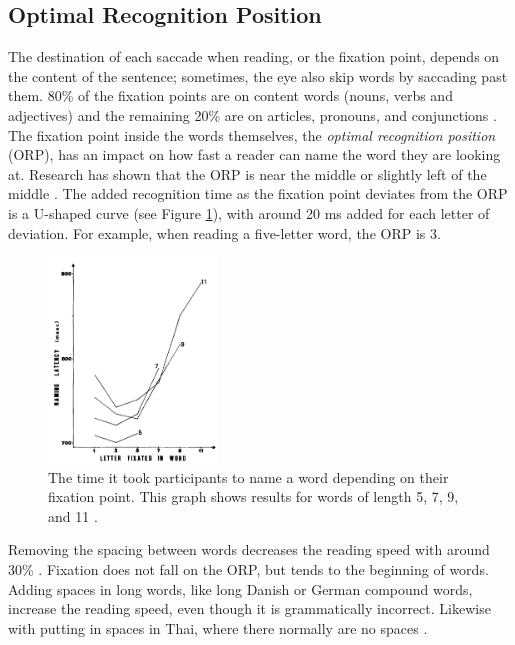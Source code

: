 \subsection{Optimal Recognition Position} \label{ORP}
The destination of each saccade when reading, or the fixation point, depends on the content of the sentence; sometimes, the eye also skip words by saccading past them. 80\% of the fixation points are on content words (nouns, verbs and adjectives) and the remaining 20\% are on articles, pronouns, and conjunctions \cite{eysenck_cognitive_2010}. The fixation point inside the words themselves, the \textit{optimal recognition position} (ORP), has an impact on how fast a reader can name the word they are looking at. Research has shown that the ORP is near the middle or slightly left of the middle \cite{oregan_optimal_1992, nazir_letter_1998, oregan_convenient_1984}. The added recognition time as the fixation point deviates from the ORP is a U-shaped curve (see Figure \ref{fig:ucurve}), with around 20 ms added for each letter of deviation. For example, when reading a five-letter word, the ORP is 3.

\begin{figure}[htbp]
\centering
\includegraphics[width=0.4\textwidth]{Pics/ucurve}
\caption{The time it took participants to name a word depending on their fixation point. This graph shows results for words of length 5, 7, 9, and 11 \protect\cite{oregan_convenient_1984}.}
\label{fig:ucurve}
\end{figure}

Removing the spacing between words decreases the reading speed with around 30\% \cite{eyeMovement}. Fixation does not fall on the ORP, but tends to the beginning of words. Adding spaces in long words, like long Danish or German compound words, increase the reading speed, even though it is grammatically incorrect. Likewise with putting in spaces in Thai, where there normally are no spaces \cite{eyeMovement}.